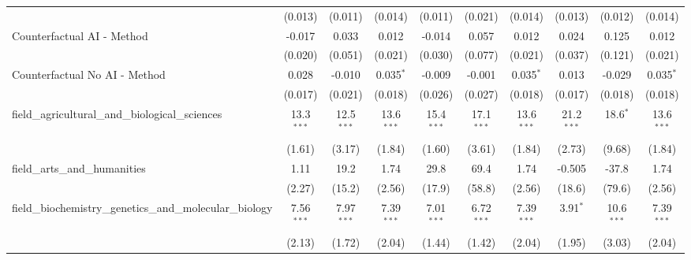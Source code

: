 \begin{tabular}{lccccccccc}
                                                               & (0.013)       & (0.011)       & (0.014)       & (0.011)       & (0.021)        & (0.014)       & (0.013)       & (0.012)       & (0.014)\\   
   Counterfactual AI - Method                                  & -0.017        & 0.033         & 0.012         & -0.014        & 0.057          & 0.012         & 0.024         & 0.125         & 0.012\\   
                                                               & (0.020)       & (0.051)       & (0.021)       & (0.030)       & (0.077)        & (0.021)       & (0.037)       & (0.121)       & (0.021)\\   
   Counterfactual No AI - Method                               & 0.028         & -0.010        & 0.035$^{*}$   & -0.009        & -0.001         & 0.035$^{*}$   & 0.013         & -0.029        & 0.035$^{*}$\\   
                                                               & (0.017)       & (0.021)       & (0.018)       & (0.026)       & (0.027)        & (0.018)       & (0.017)       & (0.018)       & (0.018)\\   
   field\_agricultural\_and\_biological\_sciences              & 13.3$^{***}$  & 12.5$^{***}$  & 13.6$^{***}$  & 15.4$^{***}$  & 17.1$^{***}$   & 13.6$^{***}$  & 21.2$^{***}$  & 18.6$^{*}$    & 13.6$^{***}$\\   
                                                               & (1.61)        & (3.17)        & (1.84)        & (1.60)        & (3.61)         & (1.84)        & (2.73)        & (9.68)        & (1.84)\\   
   field\_arts\_and\_humanities                                & 1.11          & 19.2          & 1.74          & 29.8          & 69.4           & 1.74          & -0.505        & -37.8         & 1.74\\   
                                                               & (2.27)        & (15.2)        & (2.56)        & (17.9)        & (58.8)         & (2.56)        & (18.6)        & (79.6)        & (2.56)\\   
   field\_biochemistry\_genetics\_and\_molecular\_biology      & 7.56$^{***}$  & 7.97$^{***}$  & 7.39$^{***}$  & 7.01$^{***}$  & 6.72$^{***}$   & 7.39$^{***}$  & 3.91$^{*}$    & 10.6$^{***}$  & 7.39$^{***}$\\   
                                                               & (2.13)        & (1.72)        & (2.04)        & (1.44)        & (1.42)         & (2.04)        & (1.95)        & (3.03)        & (2.04)\\   

\end{tabular}
